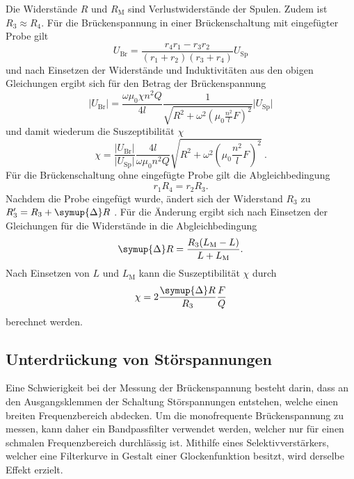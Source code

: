     Die Widerstände $R$ und $R_\text{M}$ sind Verlustwiderstände der Spulen.
    Zudem ist $R_3 \approx R_4$.
    Für die Brückenspannung in einer Brückenschaltung mit eingefügter Probe gilt
    \begin{equation*}
        U_\text{Br} = \frac{r_4 r_1 - r_3 r_2}{(r_1 + r_2)(r_3 + r_4)} U_\text{Sp}
    \end{equation*}
    und nach Einsetzen der Widerstände und Induktivitäten aus den obigen Gleichungen ergibt sich für den Betrag der Brückenspannung
    \begin{equation*}
        \lvert U_\text{Br} \rvert = \frac{\omega \mu_0 \chi n^2 Q}{4l} \frac{1}{\sqrt{R^2 + {\omega}^2(\mu_0 \frac{n^2}{l}F)^2}} \lvert U_\text{Sp} \rvert
    \end{equation*}
    und damit wiederum die Suszeptibilität $\chi$
    \begin{equation}
        \label{eqn:SusU}
        \chi = \frac{\lvert U_\text{Br} \rvert}{\lvert U_\text{Sp} \rvert} \frac{4l}{\omega \mu_0 n^2 Q} \sqrt{R^2 + {\omega}^2(\mu_0 \frac{n^2}{l}F)^2} \ .
    \end{equation}
    Für die Brückenschaltung ohne eingefügte Probe gilt die Abgleichbedingung
    \begin{equation*}
        r_1 R_4 = r_2 R_3 .
    \end{equation*}
    Nachdem die Probe eingefügt wurde,
    ändert sich der Widerstand $R_3$ zu $R'_3 = R_3 + \symup{\Delta}R$ .
    Für die Änderung ergibt sich nach Einsetzen der Gleichungen für die Widerstände in die Abgleichbedingung
    \begin{equation*}
        \symup{\Delta}R = \frac{R_3 (L_\text{M} - L)}{L + L_\text{M}} .
    \end{equation*}
    Nach Einsetzen von $L$ und $L_\text{M}$ kann die Suszeptibilität $\chi$ durch
    \begin{equation}
        \label{eqn:SusR}
        \chi = 2 \frac{\symup{\Delta}R}{R_3} \frac{F}{Q}
    \end{equation}
    berechnet werden.

\subsection{Unterdrückung von Störspannungen}
\label{sec:theorie:störspannungen}

    Eine Schwierigkeit bei der Messung der Brückenspannung besteht darin,
    dass an den Ausgangsklemmen der Schaltung Störspannungen entstehen,
    welche einen breiten Frequenzbereich abdecken.
    Um die monofrequente Brückenspannung zu messen,
    kann daher ein Bandpassfilter verwendet werden,
    welcher nur für einen schmalen Frequenzbereich durchlässig ist.
    Mithilfe eines Selektivverstärkers,
    welcher eine Filterkurve in Gestalt einer Glockenfunktion besitzt,
    wird derselbe Effekt erzielt.

